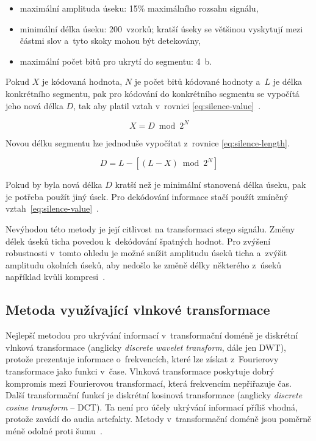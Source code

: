 \begin{itemize}
    \item maximální amplituda úseku: 15\% maximálního rozsahu signálu,
    \item minimální délka úseku: 200~vzorků; kratší úseky se většinou vyskytují
        mezi částmi slov a~tyto skoky mohou být detekovány,
    \item maximální počet bitů pro ukrytí do segmentu: 4~b.
\end{itemize}

Pokud $X$ je kódovaná hodnota, $N$ je počet bitů kódované hodnoty a~$L$ je
délka konkrétního segmentu, pak pro kódování do konkrétního segmentu se
vypočítá jeho nová délka $D$, tak aby platil vztah v~rovnici
\ref{eq:silence-value}~\cite{Shahreza2008}.

\begin{equation}
    \label{eq:silence-value}
    X = D \bmod 2^N
\end{equation}

\noindent Novou délku segmentu lze jednoduše vypočítat z~rovnice
\ref{eq:silence-length}.

\begin{equation}
    \label{eq:silence-length}
    D = L - [(L - X) \bmod 2^N]
\end{equation}

\noindent Pokud by byla nová délka $D$ kratší než je minimální stanovená délka
úseku, pak je potřeba použít jiný úsek. Pro dekódování informace stačí použít
zmíněný vztah~\ref{eq:silence-value}~\cite{Shahreza2008}.

Nevýhodou této metody je její citlivost na transformaci stego signálu. Změny
délek úseků ticha povedou k~dekódování špatných hodnot. Pro zvýšení robustnosti
v~tomto ohledu je možné snížit amplitudu úseků ticha a~zvýšit amplitudu
okolních úseků, aby nedošlo ke změně délky některého z~úseků například kvůli
kompresi~\cite{Djebbar2012}.

\subsection*{Metoda využívající vlnkové transformace}
\label{sub:wavelet-transform}

Nejlepší metodou pro ukrývání informací v~transformační doméně je diskrétní
vlnková transformace (anglicky \textit{discrete wavelet transform}, dále jen
DWT), protože prezentuje informace o~frekvencích, které lze získat z~Fourierovy
transformace jako funkci v~čase. Vlnková transformace poskytuje dobrý kompromis
mezi Fourierovou transformací, která frekvencím nepřiřazuje čas. Další
transformační funkcí je diskrétní kosinová transformace (anglicky
\textit{discrete cosine transform} -- DCT). Ta není pro účely ukrývání
informací příliš vhodná, protože zavádí do audia artefakty. Metody
v~transformační doméně jsou poměrně méně odolné proti šumu~\cite{Dutta2020}.

